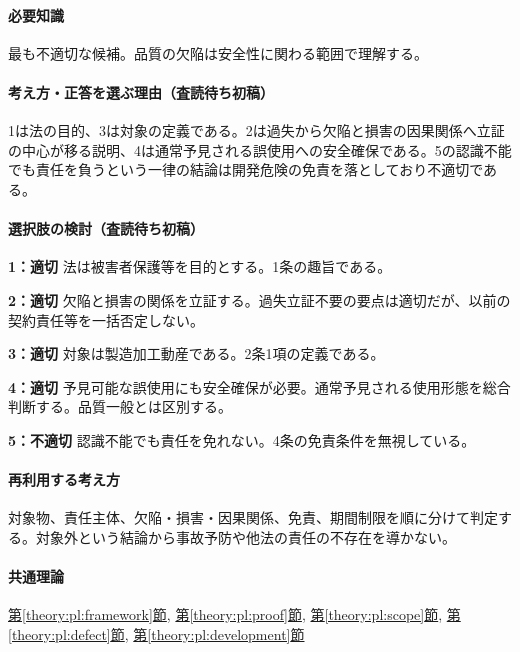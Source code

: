 \paragraph{必要知識} 最も不適切な候補。品質の欠陥は安全性に関わる範囲で理解する。

\paragraph{考え方・正答を選ぶ理由（査読待ち初稿）} 1は法の目的、3は対象の定義である。2は過失から欠陥と損害の因果関係へ立証の中心が移る説明、4は通常予見される誤使用への安全確保である。5の認識不能でも責任を負うという一律の結論は開発危険の免責を落としており不適切である。

\paragraph{選択肢の検討（査読待ち初稿）}\mbox{}\par

\noindent\textbf{1：適切} 法は被害者保護等を目的とする。1条の趣旨である。\par

\noindent\textbf{2：適切} 欠陥と損害の関係を立証する。過失立証不要の要点は適切だが、以前の契約責任等を一括否定しない。\par

\noindent\textbf{3：適切} 対象は製造加工動産である。2条1項の定義である。\par

\noindent\textbf{4：適切} 予見可能な誤使用にも安全確保が必要。通常予見される使用形態を総合判断する。品質一般とは区別する。\par

\noindent\textbf{5：不適切} 認識不能でも責任を免れない。4条の免責条件を無視している。\par

\paragraph{再利用する考え方} 対象物、責任主体、欠陥・損害・因果関係、免責、期間制限を順に分けて判定する。対象外という結論から事故予防や他法の責任の不存在を導かない。

\paragraph{共通理論} \hyperref[theory:pl:framework]{第\ref*{theory:pl:framework}節}, \hyperref[theory:pl:proof]{第\ref*{theory:pl:proof}節}, \hyperref[theory:pl:scope]{第\ref*{theory:pl:scope}節}, \hyperref[theory:pl:defect]{第\ref*{theory:pl:defect}節}, \hyperref[theory:pl:development]{第\ref*{theory:pl:development}節}

